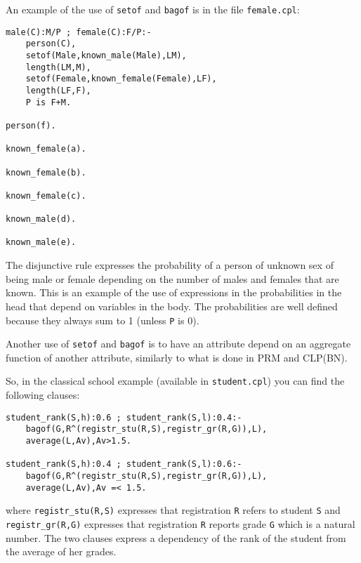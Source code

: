 \documentclass[a4paper,12pt]{article}
\begin{document}
An example of the use of \texttt{setof} and \texttt{bagof} is in the file \texttt{female.cpl}:
\begin{verbatim}
male(C):M/P ; female(C):F/P:-
    person(C),
    setof(Male,known_male(Male),LM),
    length(LM,M),
    setof(Female,known_female(Female),LF),
    length(LF,F),
    P is F+M.

person(f).

known_female(a).

known_female(b).

known_female(c).

known_male(d).

known_male(e).
\end{verbatim}
The disjunctive rule expresses the probability of a person of unknown sex of being male or female depending on the number of males and females that are known.
This is an example of the use of expressions in the probabilities in the head that depend on variables in the body. The probabilities are well defined because they always sum to 1 (unless \texttt{P} is 0).

Another use of \texttt{setof} and \texttt{bagof} is to have an attribute depend on an aggregate function of another attribute, similarly to what is done in PRM and CLP(BN).

So, in the classical school example (available in \texttt{student.cpl}) you can find the following
clauses:
\begin{verbatim}
student_rank(S,h):0.6 ; student_rank(S,l):0.4:- 
    bagof(G,R^(registr_stu(R,S),registr_gr(R,G)),L),
    average(L,Av),Av>1.5.

student_rank(S,h):0.4 ; student_rank(S,l):0.6:- 
    bagof(G,R^(registr_stu(R,S),registr_gr(R,G)),L),
    average(L,Av),Av =< 1.5.
\end{verbatim}
where \verb|registr_stu(R,S)| expresses that registration \texttt{R} refers to student \texttt{S} and \verb|registr_gr(R,G)| expresses that registration \texttt{R} reports  grade \texttt{G} which is a natural number. The two clauses express a dependency of the rank of the student from the average of her grades.
\end{document}
